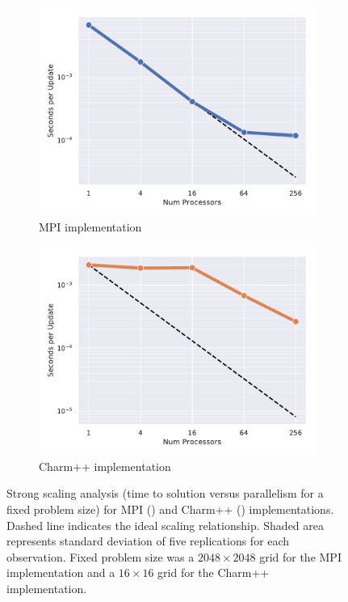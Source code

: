 
\begin{figure}
\begin{subfigure}[b]{0.5\textwidth}
\includegraphics[width=\textwidth]{img/MPIStrong}
\caption{
MPI implementation
}
\label{fig:mpi_weak}
\end{subfigure}
\begin{subfigure}[b]{0.5\textwidth}
  \includegraphics[width=\textwidth]{img/CharmStrong}
\caption{
Charm++ implementation
}
\label{fig:charm_weak}
\end{subfigure}
\caption{
Strong scaling analysis (time to solution versus parallelism for a fixed problem size) for MPI () and Charm++ () implementations.
Dashed line indicates the ideal scaling relationship.
Shaded area represents standard deviation of five replications for each observation.
Fixed problem size was a $2048\times2048$ grid for the MPI implementation and a $16\times16$ grid for the Charm++ implementation.
}
\label{fig:strong}
\end{figure}
